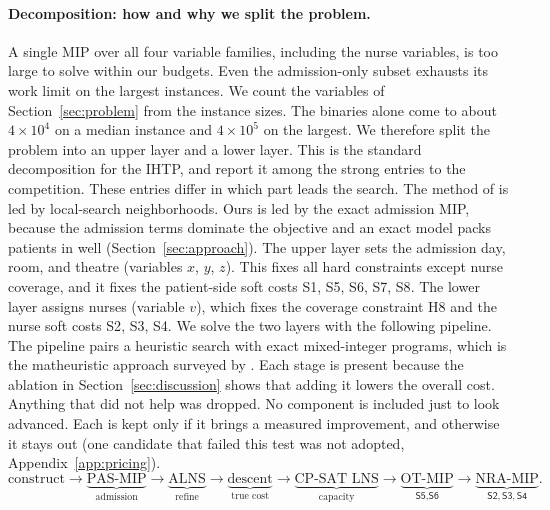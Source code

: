 \documentclass[11pt]{article}
\newcommand{\Sc}[1]{\textsf{S#1}}
\newcommand{\Hc}[1]{\textsf{H#1}}
\begin{document}
	\paragraph{Decomposition: how and why we split the problem.}
	A single MIP over all four variable families, including the nurse variables, is too large to solve within our budgets. Even the admission-only subset exhausts its work limit on the largest instances. We count the variables of Section~\ref{sec:problem} from the instance sizes. The binaries alone come to about $4\times10^4$ on a median instance and $4\times10^5$ on the largest. We therefore split the problem into an upper layer and a lower layer. This is
	the standard decomposition for the IHTP, and \citet{ihtc2024paper} report it among the strong
	entries to the competition. These entries differ in which part leads the search. The method of \citet{garciatercero2026} is led by local-search neighborhoods. Ours is led by the exact admission MIP, because the admission terms dominate the objective and an exact model packs patients in well (Section~\ref{sec:approach}). The upper layer sets the admission day, room, and theatre
	(variables $x$, $y$, $z$). This fixes all hard constraints except nurse coverage, and it fixes the
	patient-side soft costs \Sc1, \Sc5, \Sc6, \Sc7, \Sc8. The lower layer assigns nurses (variable
	$v$), which fixes the coverage constraint \Hc8 and the nurse soft costs \Sc2, \Sc3, \Sc4. We solve
	the two layers with the following pipeline. The pipeline pairs a heuristic search with exact
	mixed-integer programs, which is the matheuristic approach surveyed by \citet{maniezzo2010}. Each stage is present because the ablation in Section~\ref{sec:discussion} shows that adding it lowers the overall cost. Anything that did not help was dropped. No component is included just to look advanced. Each is kept only if it brings a measured improvement, and otherwise it stays out (one candidate that
	failed this test was not adopted, Appendix~\ref{app:pricing}).
	\[
	\text{construct} \rightarrow \underbrace{\text{PAS-MIP}}_{\text{admission}}
	\rightarrow \underbrace{\text{ALNS}}_{\text{refine}}
	\rightarrow \underbrace{\text{descent}}_{\text{true cost}}
	\rightarrow \underbrace{\text{CP-SAT LNS}}_{\text{capacity}}
	\rightarrow \underbrace{\text{OT-MIP}}_{\Sc5,\Sc6}
	\rightarrow \underbrace{\text{NRA-MIP}}_{\Sc2,\Sc3,\Sc4}.
	\]
	
\end{document}

